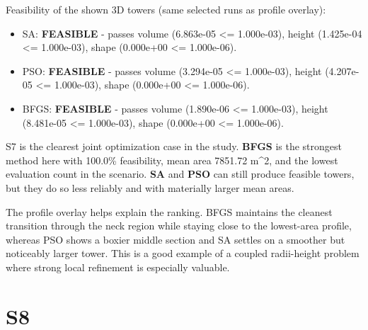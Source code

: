 Feasibility of the shown 3D towers (same selected runs as profile overlay):

\begin{itemize}
\item SA: \textbf{FEASIBLE} - passes volume (6.863e-05 <= 1.000e-03), height (1.425e-04 <= 1.000e-03), shape (0.000e+00 <= 1.000e-06).
\item PSO: \textbf{FEASIBLE} - passes volume (3.294e-05 <= 1.000e-03), height (4.207e-05 <= 1.000e-03), shape (0.000e+00 <= 1.000e-06).
\item BFGS: \textbf{FEASIBLE} - passes volume (1.890e-06 <= 1.000e-03), height (8.481e-05 <= 1.000e-03), shape (0.000e+00 <= 1.000e-06).
\end{itemize}

S7 is the clearest joint optimization case in the study. \textbf{BFGS} is the strongest method here with 100.0\% feasibility, mean area 7851.72 m\textasciicircum{}2, and the lowest evaluation count in the scenario. \textbf{SA} and \textbf{PSO} can still produce feasible towers, but they do so less reliably and with materially larger mean areas.


The profile overlay helps explain the ranking. BFGS maintains the cleanest transition through the neck region while staying close to the lowest-area profile, whereas PSO shows a boxier middle section and SA settles on a smoother but noticeably larger tower. This is a good example of a coupled radii-height problem where strong local refinement is especially valuable.



\section{S8}

\begin{table}[H]
\centering
\scriptsize
\setlength{\tabcolsep}{4pt}
\renewcommand{\arraystretch}{1.1}
\end{table}


